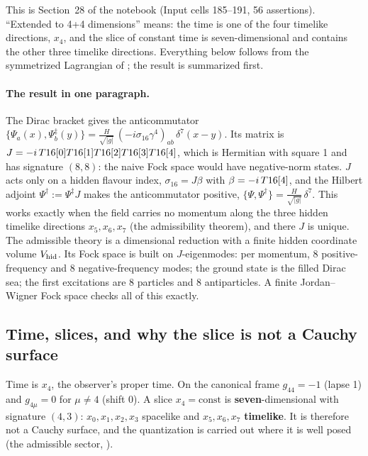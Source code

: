 This is Section~28 of the notebook (Input cells 185--191, 56 assertions). ``Extended to 4+4
dimensions'' means: the time is one of the four timelike directions, $x_4$, and the slice of
constant time is seven-dimensional and contains the other three timelike directions. Everything
below follows from the symmetrized Lagrangian of ; the result is summarized first.

\paragraph{The result in one paragraph.} The Dirac bracket gives the anticommutator
$\{\Psi_a(x),\Psi^{\ddagger}_b(y)\}=\frac{H}{\sqrt{|g|}}\,(-i\sigma_{16}\gamma^4)_{ab}\,\delta^7(x-y)$.
Its matrix is $J=-i\,T16[0]T16[1]T16[2]T16[3]T16[4]$, which is Hermitian with square 1 and
has signature $(8,8)$: the naive Fock space would have negative-norm states. $J$ acts only on a
hidden flavour index, $\sigma_{16}=J\beta$ with $\beta=-i\,T16[4]$, and the Hilbert adjoint
$\Psi^{\dagger}:=\Psi^{\ddagger}J$ makes the anticommutator positive,
$\{\Psi,\Psi^{\dagger}\}=\frac{H}{\sqrt{|g|}}\,\delta^7$. This works exactly when the field carries no
momentum along the three hidden timelike directions $x_5,x_6,x_7$ (the admissibility theorem), and
there $J$ is unique. The admissible theory is a dimensional reduction with a finite hidden coordinate
volume $V_{\mathrm{hid}}$. Its Fock space is built on $J$-eigenmodes: per momentum, 8 positive-frequency and 8
negative-frequency modes; the ground state is the filled Dirac sea; the first excitations are 8
particles and 8 antiparticles. A finite Jordan--Wigner Fock space checks all of this exactly.

\subsection{Time, slices, and why the slice is not a Cauchy surface}
\label{sec:6.1}

Time is $x_4$, the observer's proper time. On the canonical frame $g_{44}=-1$ (lapse 1) and
$g_{4\mu}=0$ for $\mu\neq4$ (shift 0). A slice $x_4=\text{const}$ is \textbf{seven}-dimensional with
signature $(4,3)$: $x_0,x_1,x_2,x_3$ spacelike and $x_5,x_6,x_7$ \textbf{timelike}. It is therefore
not a Cauchy surface, and the quantization is carried out where it is well posed (the admissible
sector, ).  


